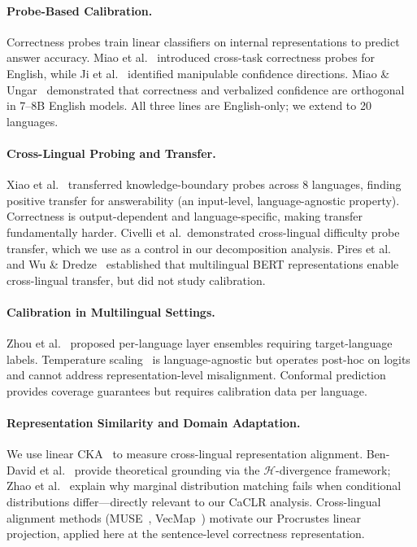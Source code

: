 \documentclass[11pt,a4paper]{article}
\begin{document}
\paragraph{Probe-Based Calibration.}
Correctness probes train linear classifiers on internal representations to predict answer accuracy.
Miao et al.~\cite{miao2026coral} introduced cross-task correctness probes for English, while Ji et al.~\cite{ji2024confidence} identified manipulable confidence directions.
Miao \& Ungar~\cite{miao2026steering} demonstrated that correctness and verbalized confidence are orthogonal in 7--8B English models.
All three lines are English-only; we extend to 20 languages.

\paragraph{Cross-Lingual Probing and Transfer.}
Xiao et al.~\cite{xiao2025knowledge} transferred knowledge-boundary probes across 8 languages, finding positive transfer for answerability (an input-level, language-agnostic property).
Correctness is output-dependent and language-specific, making transfer fundamentally harder.
Civelli et al.\ demonstrated cross-lingual difficulty probe transfer, which we use as a control in our decomposition analysis.
Pires et al.~\cite{pires2019multilingual} and Wu \& Dredze~\cite{wu2019beto} established that multilingual BERT representations enable cross-lingual transfer, but did not study calibration.

\paragraph{Calibration in Multilingual Settings.}
Zhou et al.~\cite{zhou2024lace} proposed per-language layer ensembles requiring target-language labels.
Temperature scaling~\cite{guo2017calibration} is language-agnostic but operates post-hoc on logits and cannot address representation-level misalignment.
Conformal prediction~\cite{angelopoulos2023conformal} provides coverage guarantees but requires calibration data per language.

\paragraph{Representation Similarity and Domain Adaptation.}
We use linear CKA~\cite{kornblith2019similarity} to measure cross-lingual representation alignment.
Ben-David et al.~\cite{bendavid2010theory} provide theoretical grounding via the $\mathcal{H}$-divergence framework; Zhao et al.~\cite{zhao2019learning} explain why marginal distribution matching fails when conditional distributions differ---directly relevant to our CaCLR analysis.
Cross-lingual alignment methods (MUSE~\cite{conneau2018word}, VecMap~\cite{artetxe2018robust}) motivate our Procrustes linear projection, applied here at the sentence-level correctness representation.
\end{document}
